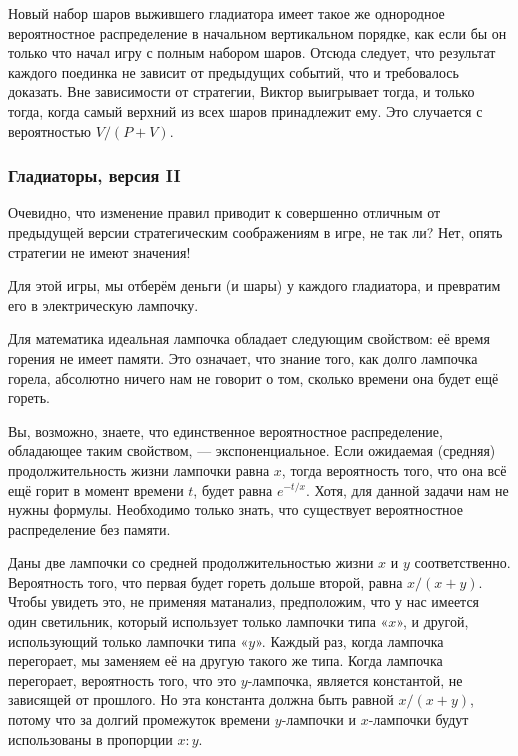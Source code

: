Новый набор шаров выжившего гладиатора имеет такое же однородное вероятностное распределение в начальном вертикальном порядке, как если бы он только что начал игру с полным набором шаров.
Отсюда следует, что результат каждого поединка не зависит от предыдущих событий, что и требовалось доказать.
Вне зависимости от стратегии, Виктор выигрывает тогда, и только тогда, когда самый верхний из всех шаров принадлежит ему.
Это случается с вероятностью $V/(P+V)$.

\subsubsection*{Гладиаторы, версия II}%

Очевидно, что изменение правил приводит к совершенно отличным от предыдущей версии стратегическим соображениям в игре, не так ли? Нет, опять стратегии не имеют значения!

\medskip

Для этой игры, мы отберём деньги (и шары) у каждого гладиатора, и превратим его
в электрическую лампочку.

Для математика идеальная лампочка обладает следующим свойством: её время горения не имеет памяти.
Это означает, что знание того, как долго лампочка горела, абсолютно ничего нам не говорит о том, сколько времени она будет ещё гореть.

Вы, возможно, знаете, что единственное вероятностное распределение, обладающее таким свойством, --- экспоненциальное.
Если ожидаемая (средняя) продолжительность жизни лампочки равна $x$, тогда вероятность того, что она всё ещё горит в момент времени $t$, будет равна $e^{-t/x}$.
Хотя, для данной задачи нам не нужны формулы.
Необходимо только знать, что существует вероятностное распределение без памяти.

Даны две лампочки со средней продолжительностью жизни $x$ и $y$ соответственно.
Вероятность того, что первая будет гореть дольше второй, равна $x/(x+y)$.
Чтобы увидеть это, не применяя матанализ, предположим, что у нас имеется один светильник, который использует только лампочки типа «$x$», и другой, использующий только лампочки типа «$y$».
Каждый раз, когда лампочка перегорает, мы заменяем её на другую такого же типа.
Когда лампочка перегорает, вероятность того, что это $y$-лампочка, является константой, не зависящей от прошлого.
Но эта константа должна быть равной $x/(x+y)$, потому что за долгий промежуток времени $y$-лампочки и $x$-лампочки будут использованы в пропорции $x : y$.


